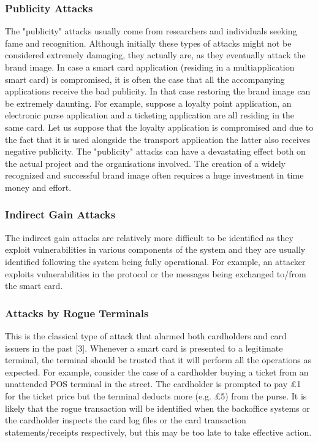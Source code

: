 \documentclass[12pt]{article}
\begin{document}
\subsubsection{Publicity Attacks}
The "publicity" attacks usually come from
researchers and individuals seeking fame and
recognition. Although initially these types of attacks
might not be considered extremely damaging, they
actually are, as they eventually attack the brand image.
In case a smart card application (residing in a multiapplication
smart card) is compromised, it is often the
case that all the accompanying applications receive the
bad publicity. In that case restoring the brand image
can be extremely daunting. For example, suppose a
loyalty point application, an electronic purse
application and a ticketing application are all residing
in the same card. Let us suppose that the loyalty
application is compromised and due to the fact that it is
used alongside the transport application the latter also
receives negative publicity. \newline
The "publicity" attacks can have a devastating
effect both on the actual project and the organisations
involved. The creation of a widely recognized and
successful brand image often requires a huge
investment in time money and effort.

\subsubsection{Indirect Gain Attacks} 
The indirect gain attacks are relatively more
difficult to be identified as they exploit vulnerabilities
in various components of the system and they are
usually identified following the system being fully
operational. For example, an attacker exploits
vulnerabilities in the protocol or the messages being
exchanged to/from the smart card.
\subsubsection{Attacks by Rogue Terminals}
This is the classical type of attack that alarmed both
cardholders and card issuers in the past [3]. Whenever
a smart card is presented to a legitimate terminal, the
terminal should be trusted that it will perform all the
operations as expected. For example, consider the case
of a cardholder buying a ticket from an unattended
POS terminal in the street. The cardholder is prompted
to pay £1 for the ticket price but the terminal deducts
more (e.g. £5) from the purse. It is likely that the
rogue transaction will be identified when the backoffice
systems or the cardholder inspects the card log
files or the card transaction statements/receipts
respectively, but this may be too late to take effective
action.
\end{document}
